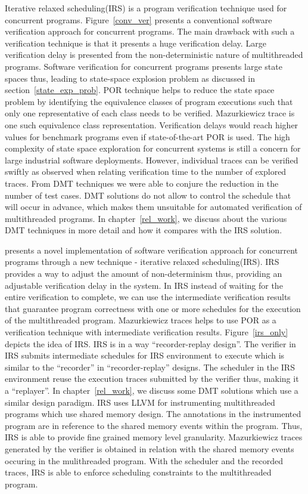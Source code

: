 Iterative relaxed scheduling(IRS) is a program verification technique used for concurrent programs. 
Figure~\ref{conv_ver} presents a conventional software verification approach for concurrent programs. 
The main drawback with such a verification technique is that it presents a huge verification delay. 
Large verification delay is presented from the non-deterministic nature of multithreaded programs. 
Software verification for concurrent programs presents large state spaces thus, leading to state-space explosion problem as discussed in section~\ref{state_exp_prob}. 
POR technique helps to reduce the state space problem by identifying the equivalence classes of program executions such that only one representative of each class needs to be verified. 
Mazurkiewicz trace\citep{mazurkiewicz1986trace} is one such equivalence class representation. 
Verification delays would reach higher values for benchmark programs even if state-of-the-art POR is used\citep{abdulla2014optimal}\citep{gueta2007cartesian}. 
The high complexity of state space exploration for concurrent systems is still a concern for large industrial software deployments. 
However, individual traces can be verified swiftly as observed when relating verification time to the number of explored traces. 
From DMT techniques we were able to conjure the reduction in the number of test cases. 
DMT solutions do not allow to control the schedule that will occur in advance, which makes them unsuitable for automated verification of multithreaded programs. 
In chapter~\ref{rel_work}, we discuss about the various DMT techniques in more detail and how it compares with the IRS solution. 

\citet{metzler2017quick} presents a novel implementation of software verification approach for concurrent programs through a new technique - iterative relaxed scheduling(IRS). 
IRS provides a way to adjust the amount of non-determinism thus, providing an adjustable verification delay in the system. 
In IRS instead of waiting for the entire verification to complete, we can use the intermediate verification results that guarantee program correctness with one or more schedules for the execution of the multithreaded program. 
Mazurkiewicz traces helps to use POR as a verification technique with intermediate verification results. 
Figure~\ref{irs_only} depicts the idea of IRS. 
IRS is in a way ``recorder-replay design''. 
The verifier in IRS submits intermediate schedules for IRS environment to execute which is similar to the ``recorder'' in ``recorder-replay'' designs. 
The scheduler in the IRS environment reuse the execution traces submitted by the verifier thus, making it a ``replayer''. 
In chapter~\ref{rel_work}, we discuss some DMT solutions which use a similar design paradigm.  
IRS uses LLVM for instrumenting multithreaded programs which use shared memory design. 
The annotations in the instrumented program are in reference to the shared memory events within the program. 
Thus, IRS is able to provide fine grained memory level granularity. 
Mazurkiewicz traces generated by the verifier is obtained in relation with the shared memory events occuring in the mulithreaded program. 
With the scheduler and the recorded traces, IRS is able to enforce scheduling constraints to the multithreaded program. 

